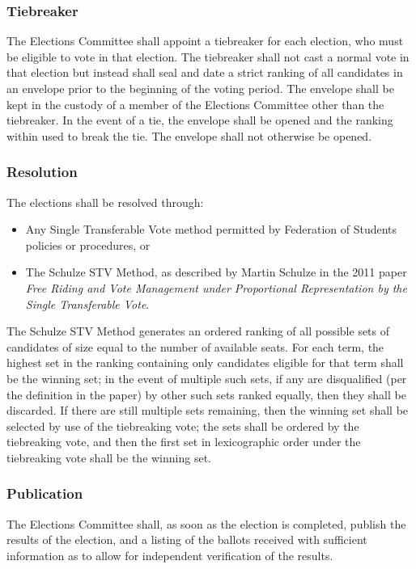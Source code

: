 \subsubsection{Tiebreaker}
The Elections Committee shall appoint a tiebreaker for each election, who must be eligible to vote in that election.
The tiebreaker shall not cast a normal vote in that election but instead shall seal and date a strict ranking of all candidates in an envelope prior to the beginning of the voting period.
The envelope shall be kept in the custody of a member of the Elections Committee other than the tiebreaker.
In the event of a tie, the envelope shall be opened and the ranking within used to break the tie.
The envelope shall not otherwise be opened.

\subsubsection{Resolution}
The elections shall be resolved through:

\begin{itemize}
	\item Any Single Transferable Vote method permitted by Federation of Students policies or procedures, or
	\item The Schulze STV Method, as described by Martin Schulze in the 2011 paper \emph{Free Riding and Vote Management under Proportional Representation by the Single Transferable Vote}.
\end{itemize}

The Schulze STV Method generates an ordered ranking of all possible sets of candidates of size equal to the number of available seats.
For each term, the highest set in the ranking containing only candidates eligible for that term shall be the winning set; in the event of multiple such sets, if any are disqualified (per the definition in the paper) by other such sets ranked equally, then they shall be discarded.
If there are still multiple sets remaining, then the winning set shall be selected by use of the tiebreaking vote; the sets shall be ordered by the tiebreaking vote, and then the first set in lexicographic order under the tiebreaking vote shall be the winning set.

\subsubsection{Publication}
The Elections Committee shall, as soon as the election is completed, publish the results of the election, and a listing of the ballots received with sufficient information as to allow for independent verification of the results.

